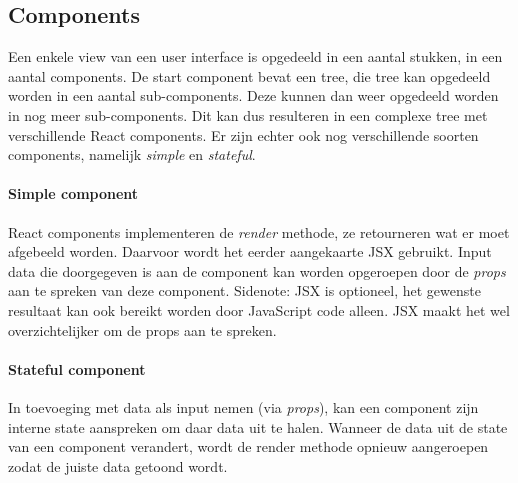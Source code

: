 \subsection{Components}
Een enkele view van een user interface is opgedeeld in een aantal stukken, in een aantal components. De start component bevat een tree, die tree kan opgedeeld worden in een aantal sub-components. Deze kunnen dan weer opgedeeld worden in nog meer sub-components. Dit kan dus resulteren in een complexe tree met verschillende React components. Er zijn echter ook nog verschillende soorten components, namelijk \textit{simple} en \textit{stateful}. 
\autocite{jsx}

\paragraph{Simple component}
React components implementeren de \textit{render} methode, ze retourneren wat er moet afgebeeld worden. Daarvoor wordt het eerder aangekaarte JSX gebruikt. Input data die doorgegeven is aan de component kan worden opgeroepen door de \textit{props} aan te spreken van deze component. Sidenote: JSX is optioneel, het gewenste resultaat kan ook bereikt worden door JavaScript code alleen. JSX maakt het wel overzichtelijker om de props aan te spreken.  
\autocite{React01}

\paragraph{Stateful component}
In toevoeging met data als input nemen (via \textit{props}), kan een component zijn interne state aanspreken om daar data uit te halen. Wanneer de data uit de state van een component verandert, wordt de render methode opnieuw aangeroepen zodat de juiste data getoond wordt.
\autocite{React01}




